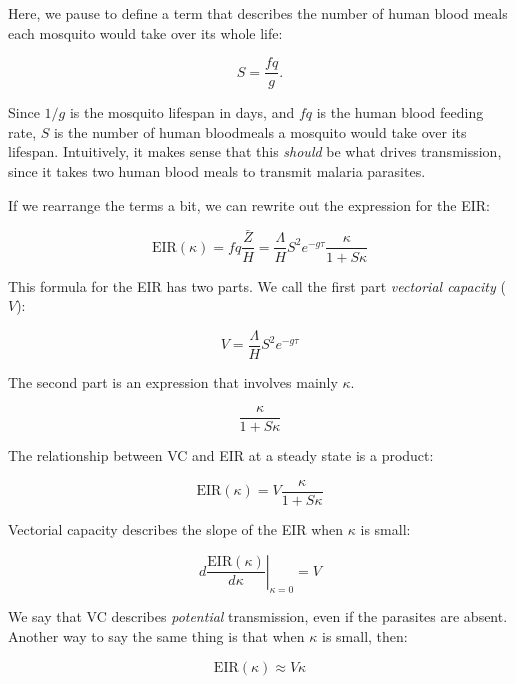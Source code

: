 \documentclass[
]{book}
\begin{document}
Here, we pause to define a term that describes the number of human blood meals each mosquito would take over its whole life:

\[S = \frac{fq}{g}.\]

Since \(1/g\) is the mosquito lifespan in days, and \(fq\) is the human blood feeding rate, \(S\) is the number of human bloodmeals a mosquito would take over its lifespan. Intuitively, it makes sense that this \emph{should} be what drives transmission, since it takes two human blood meals to transmit malaria parasites.

If we rearrange the terms a bit, we can rewrite out the expression for the EIR:

\begin{equation}
\mbox{EIR}(\kappa) = fq \frac{\bar Z}{H} = \frac{\Lambda}{H} S^2  e^{-g\tau} \frac{\kappa}{1 + S \kappa} 
\end{equation}

This formula for the EIR has two parts. We call the first part \emph{vectorial capacity} (\(V\)):

\begin{equation}
V = \frac{\Lambda}{H} S^2  e^{-g\tau} 
\label{eq:VCdefined}
\end{equation}

The second part is an expression that involves mainly \(\kappa\).

\begin{equation}
\frac{\kappa}{1 + S \kappa} 
\label{eq:EIR2ndpart}
\end{equation}

The relationship between VC and EIR at a steady state is a product:

\begin{equation}
\mbox{EIR}(\kappa) = V \frac{\kappa}{1 + S \kappa} 
\label{eq:EIR2VC}
\end{equation}

Vectorial capacity describes the slope of the EIR when \(\kappa\) is small:

\begin{equation}
\left. d\frac{\mbox{EIR}(\kappa)}{d\kappa}\right|_{\kappa = 0} = V
\label{eq:VCisdEIR}
\end{equation}

We say that VC describes \emph{potential} transmission, even if the parasites are absent. Another way to say the same thing is that when \(\kappa\) is small, then:

\begin{equation}
\mbox{EIR}(\kappa) \approx V \kappa
\end{equation}
\end{document}

